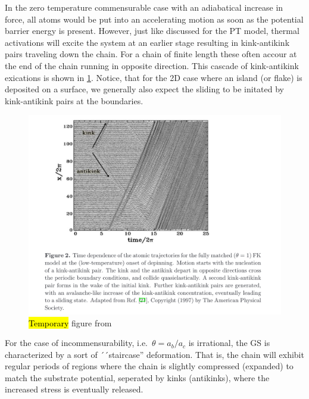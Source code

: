 In the zero temperature commensurable case with an adiabatical increase in force, all atoms would be put into an accelerating motion as soon as the potential barrier energy is present. However, just like discussed for the \acrshort{PT} model, thermal activations will excite the system at an earlier stage resulting in kink-antikink pairs traveling down the chain. For a chain of finite length these often accour at the end of the chain running in opposite direction. This cascade of kink-antikink exications is shown in \cref{fig:kink_antikink}. Notice, that for the 2D case where an island (or flake) is deposited on a surface, we generally also expect the sliding to be initated by kink-antikink pairs at the boundaries. 

\begin{figure}[H]
  \centering
  \includegraphics[width=0.8\linewidth]{figures/theory/kink_antikink.png}
  \caption{\hl{Temporary} figure from \cite{Manini_2016}}
  \label{fig:kink_antikink}
\end{figure}


For the case of incommensurability, i.e.\ $\theta = a_b/a_c$ is irrational, the
\acrshort{GS} is characterized by a sort of ´´staircase'' deformation. That is, the chain will exhibit regular periods of regions where the chain is slightly compressed (expanded) to match the substrate potential, seperated by kinks (antikinks), where the increased stress is eventually released.


